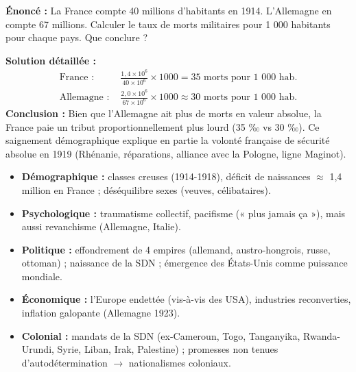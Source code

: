 \documentclass[11pt]{article}
\begin{document}
\begin{exoresolu}
\textbf{Énoncé :} La France compte 40 millions d'habitants en 1914. L'Allemagne en compte 67 millions. Calculer le taux de morts militaires pour 1 000 habitants pour chaque pays. Que conclure ?

\tcblower
\textbf{Solution détaillée :}
\begin{align*}
\text{France : } & \frac{1,4 \times 10^6}{40 \times 10^6} \times 1000 = 35 \text{ morts pour 1 000 hab.} \\
\text{Allemagne : } & \frac{2,0 \times 10^6}{67 \times 10^6} \times 1000 \approx 30 \text{ morts pour 1 000 hab.}
\end{align*}
\textbf{Conclusion :} Bien que l'Allemagne ait plus de morts en valeur absolue, la France paie un tribut proportionnellement plus lourd (35 ‰ vs 30 ‰). Ce saignement démographique explique en partie la volonté française de sécurité absolue en 1919 (Rhénanie, réparations, alliance avec la Pologne, ligne Maginot).
\end{exoresolu}

\begin{aretenir}
\begin{itemize}
\item \textbf{Démographique :} classes creuses (1914-1918), déficit de naissances $\approx$ 1,4 million en France ; déséquilibre sexes (veuves, célibataires).
\item \textbf{Psychologique :} traumatisme collectif, pacifisme (« plus jamais ça »), mais aussi revanchisme (Allemagne, Italie).
\item \textbf{Politique :} effondrement de 4 empires (allemand, austro-hongrois, russe, ottoman) ; naissance de la SDN ; émergence des États-Unis comme puissance mondiale.
\item \textbf{Économique :} l'Europe endettée (vis-à-vis des USA), industries reconverties, inflation galopante (Allemagne 1923).
\item \textbf{Colonial :} mandats de la SDN (ex-Cameroun, Togo, Tanganyika, Rwanda-Urundi, Syrie, Liban, Irak, Palestine) ; promesses non tenues d'autodétermination $\to$ nationalismes coloniaux.
\end{itemize}
\end{aretenir}
\end{document}
